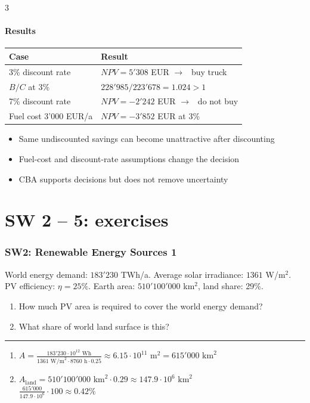 \documentclass[9pt, landscape, a4paper]{article}
\let\mathto\to
\renewcommand{\to}{\ensuremath{\mathto}\ }
\newcommand{\hr}{\vspace{0.1cm}\par\vspace{-.5\ht\strutbox}\noindent\rule{\linewidth}{.5pt}\par\vspace{0.1cm}}
\begin{document}
\begin{multicols*}{3}
\subsection{Results}
{\footnotesize
\begin{tabularx}{\columnwidth}{@{}lX@{}}
  \toprule
  \textbf{Case} & \textbf{Result}\\
  \midrule
  3\% discount rate & $NPV=5'308$ EUR $\to$ buy truck\\
  $B/C$ at 3\% & $228'985/223'678 = 1.024 > 1$\\
  7\% discount rate & $NPV=-2'242$ EUR $\to$ do not buy\\
  Fuel cost 3'000 EUR/a & $NPV=-3'852$ EUR at 3\%\\
  \bottomrule
\end{tabularx}}

\begin{itemize}
  \item Same undiscounted savings can become unattractive after discounting
  \item Fuel-cost and discount-rate assumptions change the decision
  \item CBA supports decisions but does not remove uncertainty
\end{itemize}

\part{SW 2 -- 5: exercises}

\section{SW2: Renewable Energy Sources 1}
\begin{exercisebox}
  World energy demand: $183'230$ TWh/a. Average solar irradiance: $1361$ W/m$^2$.
  PV efficiency: $\eta=25\%$. Earth area: $510'100'000$ km$^2$, land share: 29\%.
  \begin{enumerate}[label=\alph*.]
    \item How much PV area is required to cover the world energy demand?
    \item What share of world land surface is this?
  \end{enumerate}
  \hr
  \begin{enumerate}[label=\alph*.]
    \item $A=\frac{183'230\cdot10^{12}\text{ Wh}}{1361\text{ W/m}^2\cdot8760\text{ h}\cdot0.25}
      \approx 6.15\cdot10^{11}\text{ m}^2 = 615'000\text{ km}^2$
    \item $A_\text{land}=510'100'000\text{ km}^2\cdot0.29\approx147.9\cdot10^6\text{ km}^2$\\
      $\frac{615'000}{147.9\cdot10^6}\cdot100\approx0.42\%$
  \end{enumerate}
\end{exercisebox}


\end{multicols*}
\end{document}
